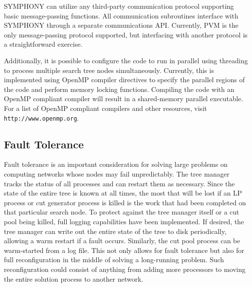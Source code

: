 SYMPHONY can utilize any third-party communication protocol supporting
basic message-passing functions. All communication subroutines
interface with SYMPHONY through a separate communications API.
Currently, PVM \cite{pvm} is the only message-passing protocol supported, but
interfacing with another protocol is a straightforward exercise.

Additionally, it is possible to configure the code to run in parallel
using threading to process multiple search tree nodes simultaneously.
Currently, this is implemented using OpenMP compiler directives to
specify the parallel regions of the code and perform memory locking
functions. Compiling the code with an OpenMP compliant compiler will
result in a shared-memory parallel executable. For a list of OpenMP
compliant compilers and other resources, visit {\tt http://www.openmp.org}.

\subsection{Fault Tolerance}
\label{fault-tolerance} 

Fault tolerance is an important consideration for solving large
problems on computing networks whose nodes may fail unpredictably. The
tree manager tracks the status of all processes and can restart them
as necessary. Since the state of the entire tree is known at all
times, the most that will be lost if an LP process or cut generator
process is killed is the work that had been completed on that
particular search node. To protect against the tree manager itself or
a cut pool being killed, full logging capabilities have been
implemented. If desired, the tree manager can write out the entire
state of the tree to disk periodically, allowing a warm restart if a
fault occurs. Similarly, the cut pool process can be warm-started from
a log file. This not only allows for fault tolerance but also for full
reconfiguration in the middle of solving a long-running problem. Such
reconfiguration could consist of anything from adding more processors
to moving the entire solution process to another network.


